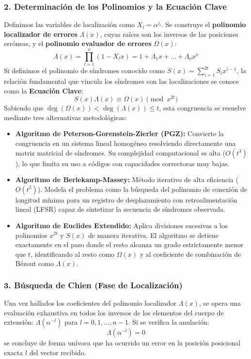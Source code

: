 \documentclass{article}
\begin{document}
\subsubsection{2. Determinación de los Polinomios y la Ecuación Clave}
Definimos las variables de localización como $X_l = \alpha^{j_l}$. Se construye el \textbf{polinomio localizador de errores} $\Lambda(x)$, cuyas raíces son los inversos de las posiciones erróneas, y el \textbf{polinomio evaluador de errores} $\Omega(x)$:
\[
\Lambda(x) = \prod_{l=1}^{\nu} (1 - X_l x) = 1 + \Lambda_1 x + \dots + \Lambda_\nu x^\nu
\]
Si definimos el polinomio de síndromes conocido como $S(x) = \sum_{i=1}^{2t} S_i x^{i-1}$, la relación fundamental que vincula los síndromes con las localizaciones se conoce como la \textbf{Ecuación Clave}:
\[
S(x)\Lambda(x) \equiv \Omega(x) \pmod{x^{2t}}
\]
Sabiendo que $\operatorname{deg}(\Omega(x)) < \operatorname{deg}(\Lambda(x)) \le t$, esta congruencia se resuelve mediante tres alternativas metodológicas:
\begin{itemize}
    \item \textbf{Algoritmo de Peterson-Gorenstein-Zierler (PGZ):} Convierte la congruencia en un sistema lineal homogéneo resolviendo directamente una matriz matricial de síndromes. Su complejidad computacional es alta ($O(t^3)$), lo que limita su uso a códigos con capacidades correctoras muy bajas.
    \item \textbf{Algoritmo de Berlekamp-Massey:} Método iterativo de alta eficiencia ($O(t^2)$). Modela el problema como la búsqueda del polinomio de conexión de longitud mínima para un registro de desplazamiento con retroalimentación lineal (LFSR) capaz de sintetizar la secuencia de síndromes observada.
    \item \textbf{Algoritmo de Euclides Extendido:} Aplica divisiones sucesivas a los polinomios $x^{2t}$ y $S(x)$ de manera iterativa. El algoritmo se detiene exactamente en el paso donde el resto alcanza un grado estrictamente menor que $t$, identificando al resto como $\Omega(x)$ y al coeficiente de combinación de Bézout como $\Lambda(x)$.
\end{itemize}

\subsubsection{3. Búsqueda de Chien (Fase de Localización)}
Una vez hallados los coeficientes del polinomio localizador $\Lambda(x)$, se opera una evaluación exhaustiva en todos los inversos de los elementos del cuerpo de extensión: $\Lambda(\alpha^{-l})$ para $l = 0, 1, \dots, n-1$. Si se verifica la anulación:
\[
\Lambda(\alpha^{-l}) = 0
\]
se concluye de forma unívoca que ha ocurrido un error en la posición posicional exacta $l$ del vector recibido.
\end{document}
